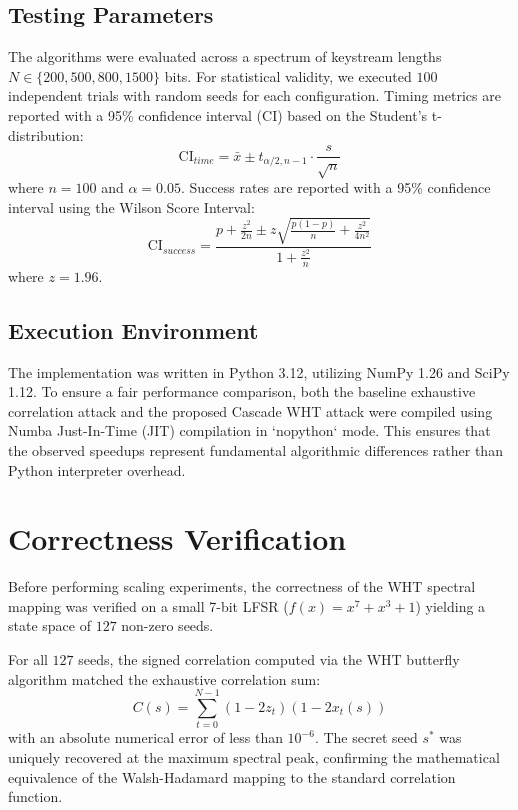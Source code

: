 \subsection{Testing Parameters}
The algorithms were evaluated across a spectrum of keystream lengths $N \in \{200, 500, 800, 1500\}$ bits.
For statistical validity, we executed $100$ independent trials with random seeds for each configuration. Timing metrics are reported with a 95\% confidence interval (CI) based on the Student's t-distribution:
\begin{equation}
    \text{CI}_{time} = \bar{x} \pm t_{\alpha/2, n-1} \cdot \frac{s}{\sqrt{n}}
\end{equation}
where $n=100$ and $\alpha=0.05$. Success rates are reported with a 95\% confidence interval using the Wilson Score Interval:
\begin{equation}
    \text{CI}_{success} = \frac{p + \frac{z^2}{2n} \pm z\sqrt{\frac{p(1-p)}{n} + \frac{z^2}{4n^2}}}{1 + \frac{z^2}{n}}
\end{equation}
where $z=1.96$.

\subsection{Execution Environment}
The implementation was written in Python 3.12, utilizing NumPy 1.26 and SciPy 1.12. To ensure a fair performance comparison, both the baseline exhaustive correlation attack and the proposed Cascade WHT attack were compiled using Numba Just-In-Time (JIT) compilation in `nopython` mode. This ensures that the observed speedups represent fundamental algorithmic differences rather than Python interpreter overhead.

\section{Correctness Verification}
\label{sec:correctness}

Before performing scaling experiments, the correctness of the WHT spectral mapping was verified on a small 7-bit LFSR ($f(x) = x^7 + x^3 + 1$) yielding a state space of $127$ non-zero seeds. 

For all $127$ seeds, the signed correlation computed via the WHT butterfly algorithm matched the exhaustive correlation sum:
\begin{equation}
    C(s) = \sum_{t=0}^{N-1} (1 - 2z_t)(1 - 2x_t(s))
\end{equation}
with an absolute numerical error of less than $10^{-6}$. The secret seed $s^*$ was uniquely recovered at the maximum spectral peak, confirming the mathematical equivalence of the Walsh-Hadamard mapping to the standard correlation function.

